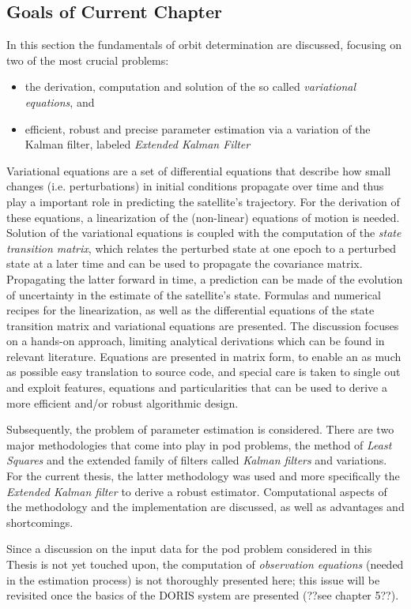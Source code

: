\subsection{Goals of Current Chapter}\label{ssec:pod-goals}
In this section the fundamentals of orbit determination are discussed, focusing on 
two of the most crucial problems:
\begin{itemize}
  \item the derivation, computation and solution of the so called \emph{variational equations}, and 
  \item efficient, robust and precise parameter estimation via a variation of the 
    Kalman filter, labeled \emph{Extended Kalman Filter}
\end{itemize}

Variational equations are a set of differential equations that describe how small changes 
(i.e. perturbations) in initial conditions propagate over time and thus play a important 
role in predicting the satellite's trajectory. For the derivation of these equations, 
a linearization of the (non-linear) equations of motion is needed. Solution of the 
variational equations is coupled with the computation of the \emph{state transition matrix}, 
which relates the perturbed state at one epoch to a perturbed state at a later time and 
can be used to propagate the covariance matrix. Propagating the latter forward in time, 
a prediction can be made of the evolution of uncertainty in the estimate of the satellite's 
state. Formulas and numerical recipes for the linearization, as well as the differential 
equations of the state transition matrix and variational equations are presented. 
The discussion focuses on a hands-on approach, limiting analytical derivations which can be 
found in relevant literature. Equations are presented in matrix form, to enable an 
as much as possible easy translation to source code, and special care is taken to 
single out and exploit features, equations and particularities that can be used to derive 
a more efficient and/or robust algorithmic design.

Subsequently, the problem of parameter estimation is considered. There are two major 
methodologies that come into play in \gls{pod} problems, the method of \emph{Least Squares} 
and the extended family of filters called \emph{Kalman filters} and variations. 
For the current thesis, the latter methodology was used and more specifically the 
\emph{Extended Kalman filter} to derive a robust estimator. Computational aspects of the 
methodology and the implementation are discussed, as well as advantages and shortcomings.

Since a discussion on the input data for the \gls{pod} problem considered in this Thesis 
is not yet touched upon, the computation of \emph{observation equations} (needed in the 
estimation process) is not thoroughly presented here; this issue will be revisited once the 
basics of the DORIS system are presented (??see chapter 5??).
